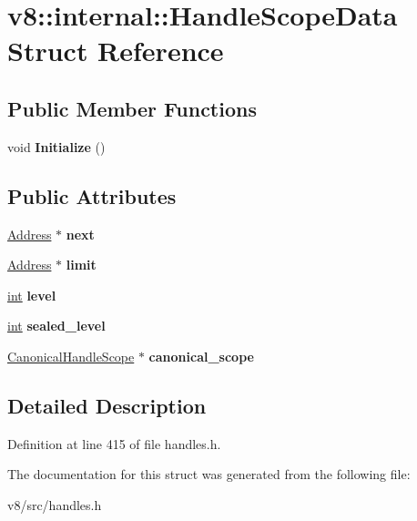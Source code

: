 \hypertarget{structv8_1_1internal_1_1HandleScopeData}{}\section{v8\+:\+:internal\+:\+:Handle\+Scope\+Data Struct Reference}
\label{structv8_1_1internal_1_1HandleScopeData}
\subsection*{Public Member Functions}
\begin{DoxyCompactItemize}
\item 
\mbox{\label{structv8_1_1internal_1_1HandleScopeData_aea891abe1d0d28f81e9fda6601e6e89b}} 
void {\bfseries Initialize} ()
\end{DoxyCompactItemize}
\subsection*{Public Attributes}
\begin{DoxyCompactItemize}
\item 
\mbox{\label{structv8_1_1internal_1_1HandleScopeData_a2ac3b397091d62ddb02fd586d57546fd}} 
\mbox{\hyperlink{classuintptr__t}{Address}} $\ast$ {\bfseries next}
\item 
\mbox{\label{structv8_1_1internal_1_1HandleScopeData_a5df0bca9edd36722eb4879eddd7e8731}} 
\mbox{\hyperlink{classuintptr__t}{Address}} $\ast$ {\bfseries limit}
\item 
\mbox{\label{structv8_1_1internal_1_1HandleScopeData_a3a33780c9478043e290d0e878ab5d485}} 
\mbox{\hyperlink{classint}{int}} {\bfseries level}
\item 
\mbox{\label{structv8_1_1internal_1_1HandleScopeData_a637cbbd70c56a059f439240782914927}} 
\mbox{\hyperlink{classint}{int}} {\bfseries sealed\+\_\+level}
\item 
\mbox{\label{structv8_1_1internal_1_1HandleScopeData_a72e6ff5975bf82e20ac23f61415360ed}} 
\mbox{\hyperlink{classv8_1_1internal_1_1CanonicalHandleScope}{Canonical\+Handle\+Scope}} $\ast$ {\bfseries canonical\+\_\+scope}
\end{DoxyCompactItemize}


\subsection{Detailed Description}


Definition at line 415 of file handles.\+h.



The documentation for this struct was generated from the following file\+:\begin{DoxyCompactItemize}
\item 
v8/src/handles.\+h\end{DoxyCompactItemize}

